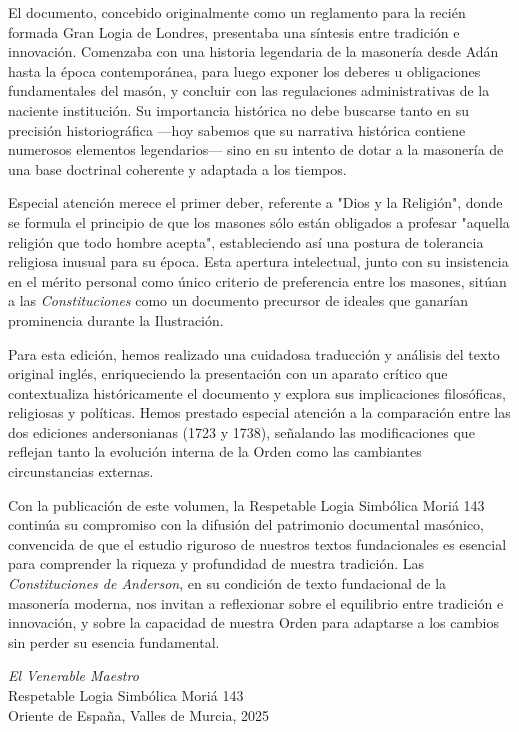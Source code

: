 \documentclass[a4paper,12pt,twoside]{book}
\begin{document}
El documento, concebido originalmente como un reglamento para la recién formada Gran Logia de Londres, presentaba una síntesis entre tradición e innovación. Comenzaba con una historia legendaria de la masonería desde Adán hasta la época contemporánea, para luego exponer los deberes u obligaciones fundamentales del masón, y concluir con las regulaciones administrativas de la naciente institución. Su importancia histórica no debe buscarse tanto en su precisión historiográfica —hoy sabemos que su narrativa histórica contiene numerosos elementos legendarios— sino en su intento de dotar a la masonería de una base doctrinal coherente y adaptada a los tiempos.

Especial atención merece el primer deber, referente a "Dios y la Religión", donde se formula el principio de que los masones sólo están obligados a profesar "aquella religión que todo hombre acepta", estableciendo así una postura de tolerancia religiosa inusual para su época. Esta apertura intelectual, junto con su insistencia en el mérito personal como único criterio de preferencia entre los masones, sitúan a las \textit{Constituciones} como un documento precursor de ideales que ganarían prominencia durante la Ilustración.

Para esta edición, hemos realizado una cuidadosa traducción y análisis del texto original inglés, enriqueciendo la presentación con un aparato crítico que contextualiza históricamente el documento y explora sus implicaciones filosóficas, religiosas y políticas. Hemos prestado especial atención a la comparación entre las dos ediciones andersonianas (1723 y 1738), señalando las modificaciones que reflejan tanto la evolución interna de la Orden como las cambiantes circunstancias externas.

Con la publicación de este volumen, la Respetable Logia Simbólica Moriá 143 continúa su compromiso con la difusión del patrimonio documental masónico, convencida de que el estudio riguroso de nuestros textos fundacionales es esencial para comprender la riqueza y profundidad de nuestra tradición. Las \textit{Constituciones de Anderson}, en su condición de texto fundacional de la masonería moderna, nos invitan a reflexionar sobre el equilibrio entre tradición e innovación, y sobre la capacidad de nuestra Orden para adaptarse a los cambios sin perder su esencia fundamental.

\vspace{1cm}
\begin{flushright}
\textit{El Venerable Maestro}\\
Respetable Logia Simbólica Moriá 143\\
Oriente de España, Valles de Murcia, 2025
\end{flushright}
\end{document}
